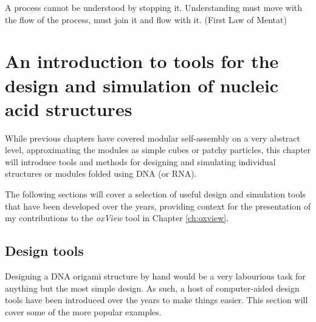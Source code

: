\begin{savequote}[8cm]
A process cannot be understood by stopping it. Understanding must move with the flow of the process, must join it and flow with it. (First Law of Mentat)
\end{savequote}

\chapter{An introduction to tools for the design and simulation of nucleic acid structures}\label{sec:toolsForIndMod}

\minitoc

While previous chapters have covered modular self-assembly on a very abstract level, approximating the modules as simple cubes or patchy particles, this chapter will introduce tools and methods for designing and simulating individual structures or modules folded using DNA (or RNA).

The following sections will cover a selection of useful design and simulation tools that have been developed over the years, providing context for the presentation of my contributions to the \emph{oxView} tool in Chapter \ref{ch:oxview}.






\section{Design tools}\label{sec:design_tools}
Designing a DNA origami structure by hand would be a very labourious task for anything but the most simple design. As such, a host of computer-aided design tools have been introduced over the years to make things easier. This section will cover some of the more popular examples.

